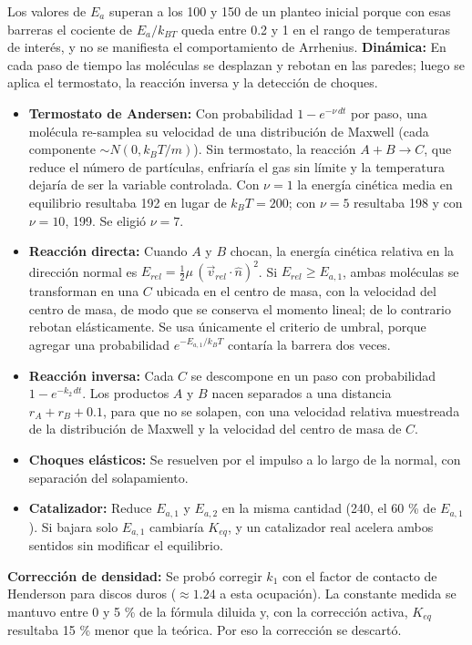 \documentclass{article}
\begin{document}
Los valores de $E_a$ superan a los 100 y 150 de un planteo inicial porque con esas barreras el cociente de $E_a/k_{BT}$ queda entre 0.2 y 1 en el rango de temperaturas de interés, y no se manifiesta el comportamiento de Arrhenius.
\textbf{Dinámica:} En cada paso de tiempo las moléculas se desplazan y rebotan en las paredes; luego se aplica el termostato, la reacción inversa y la detección de choques.
\begin{itemize}
    \item \textbf{Termostato de Andersen:} Con probabilidad $1 - e^{-\nu\,dt}$ por paso, una molécula re-samplea su velocidad de una distribución de Maxwell (cada componente $\sim N(0, k_BT/m)$). Sin termostato, la reacción $A+B\to C$, que reduce el número de partículas, enfriaría el gas sin límite y la temperatura dejaría de ser la variable controlada. Con $\nu = 1$ la energía cinética media en equilibrio resultaba 192 en lugar de $k_BT = 200$; con $\nu = 5$ resultaba 198 y con $\nu = 10$, 199. Se eligió $\nu = 7$.
    \item \textbf{Reacción directa:} Cuando $A$ y $B$ chocan, la energía cinética relativa en la dirección normal es $E_{rel} = \frac{1}{2}\mu\,(\vec v_{rel}\cdot\hat n)^2$. Si $E_{rel} \ge E_{a,1}$, ambas moléculas se transforman en una $C$ ubicada en el centro de masa, con la velocidad del centro de masa, de modo que se conserva el momento lineal; de lo contrario rebotan elásticamente. Se usa únicamente el criterio de umbral, porque agregar una probabilidad $e^{-E_{a,1}/k_BT}$ contaría la barrera dos veces.
    \item \textbf{Reacción inversa:} Cada $C$ se descompone en un paso con probabilidad $1 - e^{-k_2\,dt}$. Los productos $A$ y $B$ nacen separados a una distancia $r_A + r_B + 0.1$, para que no se solapen, con una velocidad relativa muestreada de la distribución de Maxwell y la velocidad del centro de masa de $C$.
    \item \textbf{Choques elásticos:} Se resuelven por el impulso a lo largo de la normal, con separación del solapamiento.
    \item \textbf{Catalizador:} Reduce $E_{a,1}$ y $E_{a,2}$ en la misma cantidad (240, el 60 \% de $E_{a,1}$). Si bajara solo $E_{a,1}$ cambiaría $K_{eq}$, y un catalizador real acelera ambos sentidos sin modificar el equilibrio.
\end{itemize}
\textbf{Corrección de densidad:} Se probó corregir $k_1$ con el factor de contacto de Henderson para discos duros ($\approx 1.24$ a esta ocupación). La constante medida se mantuvo entre 0 y 5 \% de la fórmula diluida y, con la corrección activa, $K_{eq}$ resultaba 15 \% menor que la teórica. Por eso la corrección se descartó.
\end{document}
